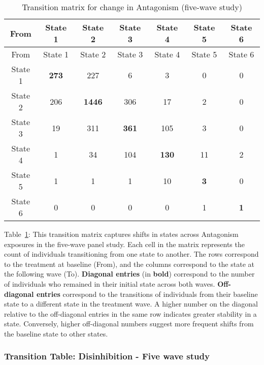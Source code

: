 \documentclass[
  single column]{article}
\begin{document}
\begin{longtable}[]{@{}ccccccc@{}}
\caption{Transition matrix for change in Antagonism (five-wave
study)}\label{tbl-table-transition-antagonism-long}\tabularnewline
\toprule\noalign{}
From & State 1 & State 2 & State 3 & State 4 & State 5 & State 6 \\
\midrule\noalign{}
\endfirsthead
\toprule\noalign{}
From & State 1 & State 2 & State 3 & State 4 & State 5 & State 6 \\
\midrule\noalign{}
\endhead
\bottomrule\noalign{}
\endlastfoot
State 1 & \textbf{273} & 227 & 6 & 3 & 0 & 0 \\
State 2 & 206 & \textbf{1446} & 306 & 17 & 2 & 0 \\
State 3 & 19 & 311 & \textbf{361} & 105 & 3 & 0 \\
State 4 & 1 & 34 & 104 & \textbf{130} & 11 & 2 \\
State 5 & 1 & 1 & 1 & 10 & \textbf{3} & 0 \\
State 6 & 0 & 0 & 0 & 0 & 1 & \textbf{1} \\
\end{longtable}

Table~\ref{tbl-table-transition-antagonism-long}: This transition matrix
captures shifts in states across Antagonism exposures in the five-wave
panel study. Each cell in the matrix represents the count of individuals
transitioning from one state to another. The rows correspond to the
treatment at baseline (From), and the columns correspond to the state at
the following wave (To). \textbf{Diagonal entries} (in \textbf{bold})
correspond to the number of individuals who remained in their initial
state across both waves. \textbf{Off-diagonal entries} correspond to the
transitions of individuals from their baseline state to a different
state in the treatment wave. A higher number on the diagonal relative to
the off-diagonal entries in the same row indicates greater stability in
a state. Conversely, higher off-diagonal numbers suggest more frequent
shifts from the baseline state to other states.

\subsubsection{Transition Table: Disinhibition - Five wave
study}\label{transition-table-disinhibition---five-wave-study}
\end{document}
